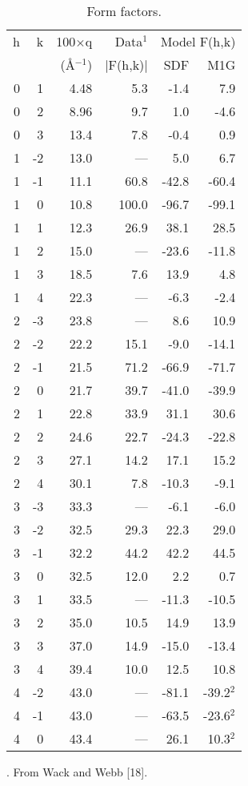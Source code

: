 \begin{table}
\caption{Form factors.
\label{formfactor}}
\vspace{6pt}
\begin{tabular}{rrrrrr} 
h & k & 100$\times$q & Data$^{1}$ &
        \multicolumn{2}{c}{Model F(h,k)} \\ \cline{5-6}
& & (\AA$^{-1}$) & $|$F(h,k)$|$ & SDF & M1G \\ \hline
0 &  1 & 4.48  &  5.3  &  -1.4  &  7.9  \\
0 &  2 & 8.96  & 9.7  &  1.0  &  -4.6 \\
0 &  3 & 13.4  &  7.8  &  -0.4   &  0.9 \\
1 &  -2 & 13.0  &  ---  &  5.0  &  6.7   \\
1 &  -1 & 11.1  &  60.8  &  -42.8  &  -60.4 \\
1 &   0 & 10.8  &  100.0  &  -96.7  &  -99.1 \\
1 &   1 & 12.3  &  26.9  &  38.1  &  28.5 \\
1 &   2 & 15.0  &  ---  &  -23.6  &  -11.8 \\
1 &   3 & 18.5  &  7.6  &  13.9  &  4.8 \\
1 &   4 & 22.3  &  ---  &  -6.3  &  -2.4 \\
2 &  -3 & 23.8  &  ---  &  8.6  &  10.9 \\
2 &  -2 & 22.2  &  15.1  &  -9.0  &  -14.1 \\
2 &  -1 & 21.5  &  71.2  &  -66.9  &  -71.7 \\
2 &   0 & 21.7  &  39.7  &  -41.0  &  -39.9 \\
2 &   1 & 22.8  &  33.9  &  31.1  &  30.6 \\
2 &   2 & 24.6  &  22.7  &  -24.3  &  -22.8 \\
2 &   3 & 27.1  &  14.2  &  17.1  &  15.2 \\
2 &   4 & 30.1  &  7.8  &  -10.3  &  -9.1 \\
3 &  -3 & 33.3  &  ---  &  -6.1  &  -6.0 \\
3 &  -2 & 32.5  &  29.3  &  22.3  &  29.0 \\
3 &  -1 & 32.2  &  44.2  &  42.2  &  44.5 \\
3 &   0 & 32.5  &  12.0    &  2.2  &  0.7   \\
3 &   1 & 33.5  &  ---  &  -11.3  &  -10.5 \\
3 &   2 & 35.0  &  10.5  &  14.9  &  13.9 \\
3 &   3 & 37.0  &  14.9  &  -15.0  &  -13.4 \\
3 &   4 & 39.4  &  10.0  &  12.5  &  10.8 \\
4 &  -2 & 43.0  &  ---  &  -81.1  &  -39.2$^{2}$ \\
4 &  -1 & 43.0  &  ---  &  -63.5  &  -23.6$^{2}$ \\
4 &   0 & 43.4  &  ---  &  26.1  &  10.3$^{2}$ \\
\end{tabular}
{\small
{}. From Wack and Webb [18].

}
\end{table}
